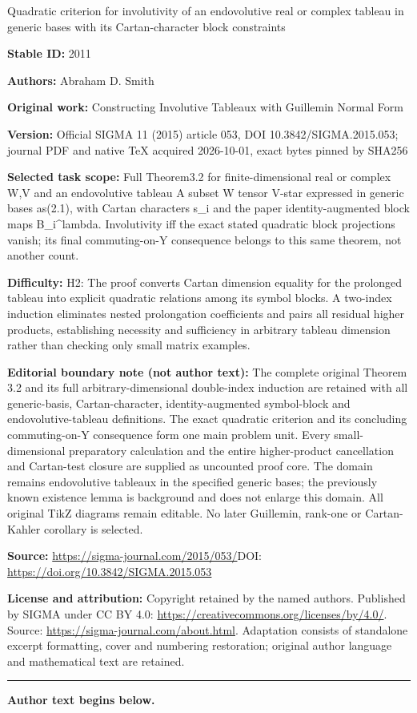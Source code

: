 \documentclass[11pt]{article}
\numberwithin{equation}{section}
\begin{document}
\begin{center}\Large Quadratic criterion for involutivity of an endovolutive real or complex tableau in generic bases with its Cartan-character block constraints\end{center}
\noindent\textbf{Stable ID:} 2011\par
\noindent\textbf{Authors:} Abraham D. Smith\par
\noindent\textbf{Original work:} Constructing Involutive Tableaux with Guillemin Normal Form\par
\noindent\textbf{Version:} Official SIGMA 11 (2015) article 053, DOI 10.3842/SIGMA.2015.053; journal PDF and native TeX acquired 2026-10-01, exact bytes pinned by SHA256\par
\noindent\textbf{Selected task scope:} Full Theorem3.2 for finite-dimensional real or complex W,V and an endovolutive tableau A subset W tensor V-star expressed in generic bases as(2.1), with Cartan characters s\_i and the paper identity-augmented block maps B\_i\textasciicircum{}lambda. Involutivity iff the exact stated quadratic block projections vanish; its final commuting-on-Y consequence belongs to this same theorem, not another count.\par
\noindent\textbf{Difficulty:} H2: The proof converts Cartan dimension equality for the prolonged tableau into explicit quadratic relations among its symbol blocks. A two-index induction eliminates nested prolongation coefficients and pairs all residual higher products, establishing necessity and sufficiency in arbitrary tableau dimension rather than checking only small matrix examples.\par
\noindent\textbf{Editorial boundary note (not author text):} The complete original Theorem 3.2 and its full arbitrary-dimensional double-index induction are retained with all generic-basis, Cartan-character, identity-augmented symbol-block and endovolutive-tableau definitions. The exact quadratic criterion and its concluding commuting-on-Y consequence form one main problem unit. Every small-dimensional preparatory calculation and the entire higher-product cancellation and Cartan-test closure are supplied as uncounted proof core. The domain remains endovolutive tableaux in the specified generic bases; the previously known existence lemma is background and does not enlarge this domain. All original TikZ diagrams remain editable. No later Guillemin, rank-one or Cartan-Kahler corollary is selected.\par
\noindent\textbf{Source:} \url{https://sigma-journal.com/2015/053/}\quad DOI: \url{https://doi.org/10.3842/SIGMA.2015.053}\par
\noindent\textbf{License and attribution:} Copyright retained by the named authors. Published by SIGMA under CC BY 4.0: \url{https://creativecommons.org/licenses/by/4.0/}. Source: \url{https://sigma-journal.com/about.html}. Adaptation consists of standalone excerpt formatting, cover and numbering restoration; original author language and mathematical text are retained.\par
\medskip\hrule\medskip\noindent\textbf{Author text begins below.}\par
\setcounter{section}{0}
\setcounter{subsection}{0}
\setcounter{subsubsection}{0}
\setcounter{Theorem}{0}
\setcounter{equation}{0}
\end{document}
